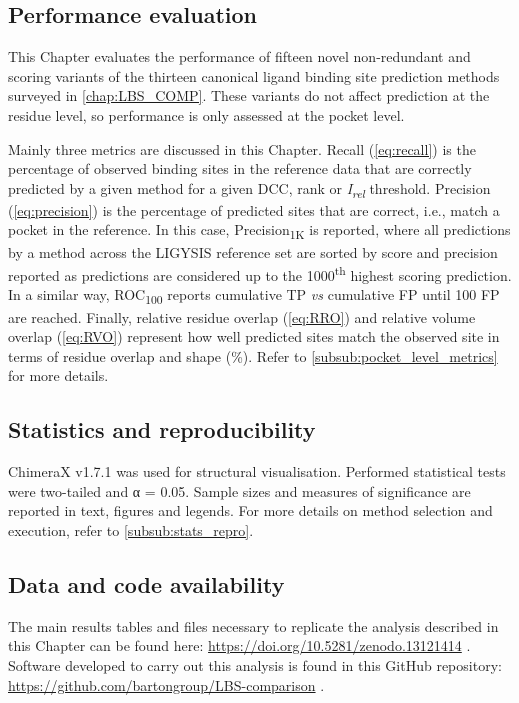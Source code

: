 \subsection{Performance evaluation}

This Chapter evaluates the performance of fifteen novel non-redundant and scoring variants of the thirteen canonical ligand binding site prediction methods surveyed in \autoref{chap:LBS_COMP}. These variants do not affect prediction at the residue level, so performance is only assessed at the pocket level.

Mainly three metrics are discussed in this Chapter. Recall (\autoref{eq:recall}) is the percentage of observed binding sites in the reference data that are correctly predicted by a given method for a given DCC, rank or \textit{I\textsubscript{rel}} threshold. Precision (\autoref{eq:precision}) is the percentage of predicted sites that are correct, i.e., match a pocket in the reference. In this case, Precision\textsubscript{1K} is reported, where all predictions by a method across the LIGYSIS reference set are sorted by score and precision reported as predictions are considered up to the 1000\textsuperscript{th} highest scoring prediction. In a similar way, ROC\textsubscript{100} \cite{WEBBER_2003_ROC100} reports cumulative TP \textit{vs} cumulative FP until 100 FP are reached. Finally, relative residue overlap (\autoref{eq:RRO}) and relative volume overlap (\autoref{eq:RVO}) represent how well predicted sites match the observed site in terms of residue overlap and shape (\%). Refer to \autoref{subsub:pocket_level_metrics} for more details.


\subsection{Statistics and reproducibility}

ChimeraX v1.7.1 \cite{PETTERSEN_2021_CHIMERAX} was used for structural visualisation. Performed statistical tests were two-tailed and α = 0.05. Sample sizes and measures of significance are reported in text, figures and legends. For more details on method selection and execution, refer to \autoref{subsub:stats_repro}.

\subsection{Data and code availability}

The main results tables and files necessary to replicate the analysis described in this Chapter can be found here: \url{https://doi.org/10.5281/zenodo.13121414} \cite{UTGES_2024_LBSCOMP_ZENODO}. Software developed to carry out this analysis is found in this GitHub repository: \url{https://github.com/bartongroup/LBS-comparison} \cite{UTGES_2024_LBSCOMP_REPO}.


